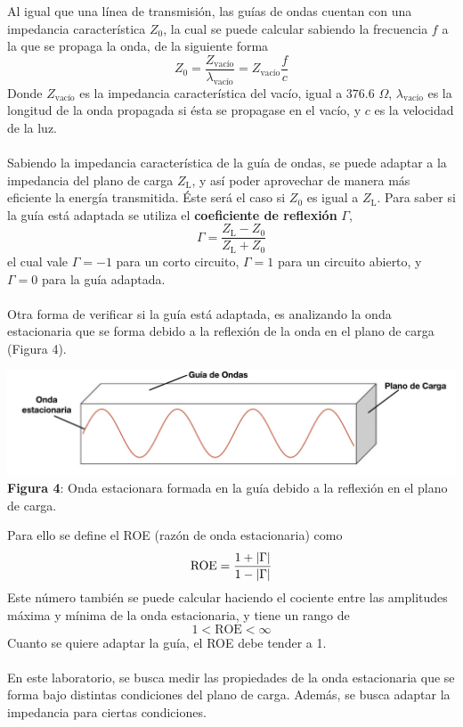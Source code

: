 \documentclass[11pt,a4paper]{article}
\DeclarePairedDelimiter\abs{\lvert}{\rvert}%
\begin{document}
\begin{multicols}{2}
Al igual que una línea de transmisión, las guías de ondas cuentan con una impedancia característica $Z_0$, la cual se puede calcular sabiendo la frecuencia $f$ a la que se propaga la onda, de la siguiente forma
\begin{equation}
    Z_0=\frac{Z_\text{vacío}}{\lambda_\text{vacío}}=Z_\text{vacío}\frac{f}{c}
\end{equation}
Donde $Z_\text{vacío}$ es la impedancia característica del vacío, igual a $376.6$ $\Omega$, $\lambda_\text{vacío}$ es la longitud de la onda propagada si ésta se propagase en el vacío, y $c$ es la velocidad de la luz.\\ \\
Sabiendo la impedancia característica de la guía de ondas, se puede adaptar a la impedancia del plano de carga $Z_\text{L}$, y así poder aprovechar de manera más eficiente la energía transmitida. Éste será el caso si $Z_0$ es igual a $Z_\text{L}$. Para saber si la guía está adaptada se utiliza el \textbf{coeficiente de reflexión} $\Gamma$,
\begin{equation}\label{eq:gamma}
    \Gamma = \frac{Z_\text{L}-Z_0}{Z_\text{L}+Z_0}
\end{equation}
el cual vale $\Gamma = -1$ para un corto circuito, $\Gamma = 1$ para un circuito abierto, y $\Gamma = 0$ para la guía adaptada. \\ \\ 
Otra forma de verificar si la guía está adaptada, es analizando la onda estacionaria que se forma debido a la reflexión de la onda en el plano de carga (Figura 4).
\begin{center}
    \includegraphics[scale=0.28]{Images/Para el informe.jpg} \\
    \textbf{Figura 4}: Onda estacionara formada en la guía debido a la reflexión en el plano de carga. 
\end{center}
Para ello se define el ROE (razón de onda estacionaria) como
\begin{equation}
    \text{ROE} = \frac{1+\abs{\Gamma}}{1-\abs{\Gamma}}
\end{equation}
Este número también se puede calcular haciendo el cociente entre las amplitudes máxima y mínima de la onda estacionaria, y tiene un rango de 
$$
1<\text{ROE} < \infty
$$
Cuanto se quiere adaptar la guía, el ROE debe tender a 1. \\ \\
En este laboratorio, se busca medir las propiedades de la onda estacionaria que se forma bajo distintas condiciones del plano de carga. Además, se busca adaptar la impedancia para ciertas condiciones. 

\end{multicols}
\end{document}
